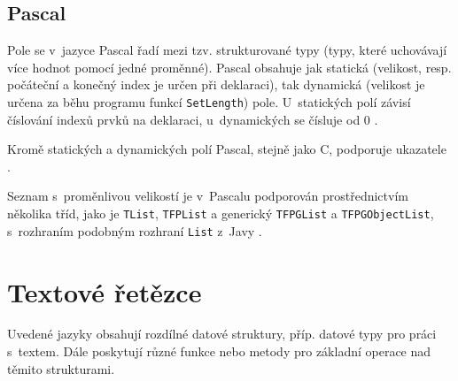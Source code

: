 \documentclass{bakalarka}
\begin{document}
\subsection{Pascal}
Pole se v~jazyce Pascal řadí mezi tzv. strukturované typy (typy, které uchovávají více hodnot pomocí jedné proměnné). Pascal obsahuje jak statická (velikost, resp. počáteční a konečný index je určen při deklaraci), tak dynamická (velikost je určena za běhu programu funkcí \texttt{SetLength}) pole. U~statických polí závisí číslování indexů prvků na deklaraci, u~dynamických se čísluje od 0 \cite{pas-guide-structured-types, pas-guide-static-array, pas-guide-dynamic-array}.\par\noindent
Kromě statických a dynamických polí Pascal, stejně jako C, podporuje ukazatele \cite{pas-guide-pointer}.\par
Seznam s~proměnlivou velikostí je v~Pascalu podporován prostřednictvím několika tříd, jako je \texttt{TList}, \texttt{TFPList} a generický \texttt{TFPGList} a \texttt{TFPGObjectList}, s~rozhraním podobným rozhraní \texttt{List} z~Javy \cite{pas-guide-tlist, pas-guide-tfplist, pas-guide-tfpglist, pas-guide-tfpgobjectlist}.

\section{Textové řetězce}\label{sec:strings}
Uvedené jazyky obsahují rozdílné datové struktury, příp. datové typy pro práci s~textem. Dále poskytují různé funkce nebo metody pro základní operace nad těmito strukturami.
\end{document}
